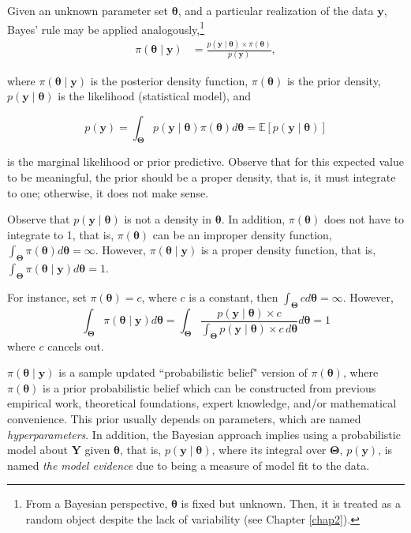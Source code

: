 Given an unknown parameter set \( \bm{\theta} \), and a particular realization of the data \( \mathbf{y} \), Bayes' rule may be applied analogously,\footnote{From a Bayesian perspective, \( \bm{\theta} \) is fixed but unknown. Then, it is treated as a random object despite the lack of variability (see Chapter \ref{chap2}).}
\begin{align}
	\pi(\bm{\theta}\mid \mathbf{y})&=\frac{p(\mathbf{y}\mid \bm{\theta}) \times \pi(\bm{\theta})}{p(\mathbf{y})},
	\label{eq:121}
\end{align}

where $\pi(\bm{\theta}\mid \mathbf{y})$ is the posterior density function, $\pi(\bm{\theta})$ is the prior density, $p(\mathbf{y}\mid \bm{\theta})$ is the likelihood (statistical model), and

\begin{equation}
	p(\mathbf{y})=\int_{\mathbf{\Theta}}p(\mathbf{y}\mid \bm{\theta})\pi(\bm{\theta})d\bm{\theta}=\mathbb{E}\left[p(\mathbf{y}\mid \bm{\theta})\right]
	\label{eq:121a}
\end{equation}

is the marginal likelihood or prior predictive. Observe that for this expected value to be meaningful, the prior should be a proper density, that is, it must integrate to one; otherwise, it does not make sense.


Observe that \( p(\mathbf{y} \mid \bm{\theta}) \) is not a density in \( \bm{\theta} \). In addition, \( \pi(\bm{\theta}) \) does not have to integrate to 1, that is, \( \pi(\bm{\theta}) \) can be an improper density function, \( \int_{\mathbf{\Theta}} \pi(\bm{\theta}) d\bm{\theta} = \infty \). However, \( \pi(\bm{\theta} \mid \mathbf{y}) \) is a proper density function, that is, \( \int_{\mathbf{\Theta}} \pi(\bm{\theta} \mid \mathbf{y}) d\bm{\theta} = 1 \). 

For instance, set \( \pi(\bm{\theta}) = c \), where \( c \) is a constant, then \( \int_{\mathbf{\Theta}} c d\bm{\theta} = \infty \). However,
\[
\int_{\mathbf{\Theta}} \pi(\bm{\theta} \mid \mathbf{y}) d\bm{\theta} = \int_{\mathbf{\Theta}} \frac{p(\mathbf{y} \mid \bm{\theta}) \times c}{\int_{\mathbf{\Theta}} p(\mathbf{y} \mid \bm{\theta}) \times c \, d\bm{\theta}} d\bm{\theta} = 1
\]
where \( c \) cancels out. 

\(\pi(\bm{\theta} \mid \mathbf{y})\) is a sample updated ``probabilistic belief" version of \(\pi(\bm{\theta})\), where \(\pi(\bm{\theta})\) is a prior probabilistic belief which can be constructed from previous empirical work, theoretical foundations, expert knowledge, and/or mathematical convenience. This prior usually depends on parameters, which are named \textit{hyperparameters}. In addition, the Bayesian approach implies using a probabilistic model about \(\mathbf{Y}\) given \(\bm{\theta}\), that is, \(p(\mathbf{y} \mid \bm{\theta})\), where its integral over \(\mathbf{\Theta}\), \(p(\mathbf{y})\), is named \textit{the model evidence} due to being a measure of model fit to the data.

